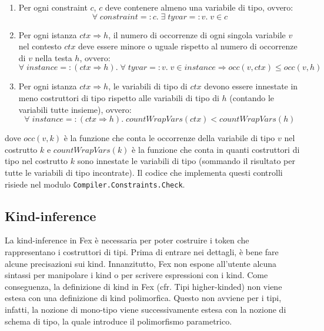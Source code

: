 \documentclass[10pt,a4paper]{article}
\begin{document}
\begin{enumerate}
    \item Per ogni constraint $ c $, $ c $ deve contenere almeno una variabile di tipo, ovvero:
    \[ \forall \; constraint =: c.\; \exists \; tyvar =: v.\; v \in c \]
    \item Per ogni istanza $ ctx \Rightarrow h $, il numero di occorrenze di ogni singola variabile $ v $ nel contesto
    $ ctx $ deve essere minore o uguale rispetto al numero di occorrenze di $ v $ nella testa $ h $, ovvero:
    \[ \forall \; instance =: (ctx \Rightarrow h).\; \forall \; tyvar =: v.\; v \in instance
    \Longrightarrow occ(v, ctx) \leq occ(v, h) \]
    \item Per ogni istanza $ ctx \Rightarrow h $, le variabili di tipo di $ ctx $ devono essere innestate in meno
    costruttori di tipo rispetto alle variabili di tipo di $ h $ (contando le variabili tutte insieme), ovvero: \newline
    \[ \forall \; instance =: (ctx \Rightarrow h).\; countWrapVars(ctx) < countWrapVars(h) \]
\end{enumerate}
dove $ occ(v, k) $ è la funzione che conta le occorrenze della variabile di tipo $ v $ nel costrutto $ k $ e
$ countWrapVars(k) $ è la funzione che conta in quanti costruttori di tipo nel costrutto $ k $ sono innestate le
variabili di tipo (sommando il risultato per tutte le variabili di tipo incontrate). Il codice che implementa questi
controlli risiede nel modulo \texttt{Compiler.Constraints.Check}.

\subsection{Kind-inference}
La kind-inference in Fex è necessaria per poter costruire i token che rappresentano i costruttori di tipi. Prima
di entrare nei dettagli, è bene fare alcune precisazioni sui kind. Innanzitutto, Fex non espone all'utente alcuna
sintassi per manipolare i kind o per scrivere espressioni con i kind. Come conseguenza, la definizione di kind in
Fex (cfr. Tipi higher-kinded) non viene estesa con una definizione di kind polimorfica. Questo non avviene per i tipi,
infatti, la nozione di mono-tipo viene successivamente estesa con la nozione di schema di tipo, la quale introduce
il polimorfismo parametrico.
\end{document}
